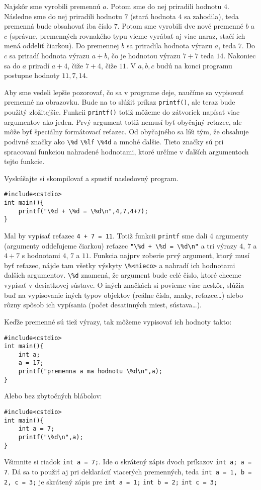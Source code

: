 \riesenie
Najskôr sme vyrobili premennú $a$. Potom sme do nej priradili hodnotu $4$.
Následne sme do nej priradili hodnotu $7$ (stará hodnota $4$ sa zahodila), teda
premenná bude obsahovať iba číslo $7$. Potom sme vyrobili dve nové premenné $b$
a $c$ (správne, premenných rovnakého typu vieme vyrábať aj viac naraz, stačí
ich mená oddeliť čiarkou).  Do premennej $b$ sa priradila hodnota výrazu $a$,
teda $7$. Do $c$ sa priradí hodnota výrazu $a + b$, čo je hodnotou výrazu $7 +
7$ teda $14$. Nakoniec sa do $a$ priradí $a + 4$, čiže $7+4$, čiže $11$. V
$a,b,c$ budú na konci programu postupne hodnoty $11,7,14$.

\medskip

Aby sme vedeli lepšie pozorovať, čo sa v programe deje, naučíme sa vypisovať
premenné na obrazovku. Bude na to slúžiť príkaz \verb!printf()!, ale teraz bude
použitý zložitejšie. Funkcii \verb!printf()! totiž môžeme do zátvoriek napísať
viac argumentov ako jeden. Prvý argument totiž nemusí byť obyčajný reťazec,
ale môže byť špeciálny formátovací reťazec. Od obyčajného sa líši tým, že
obsahuje podivné značky ako \verb!\%d! \verb!\%lf! \verb!\%4d! a mnohé ďalšie.
Tieto značky sú pri spracovaní funkciou nahradené hodnotami, ktoré určíme v
ďalších argumentoch tejto funkcie.

Vyskúšajte si skompilovať a spustiť nasledovný program.
\begin{lstlisting}
#include<cstdio>
int main(){
    printf("\%d + \%d = \%d\n",4,7,4+7);
}
\end{lstlisting}
Mal by vypísať reťazec \verb!4 + 7 = 11!. Totiž funkcii \verb!printf! sme dali
4 argumenty (argumenty oddeľujeme čiarkou) reťazec \verb!"\%d + \%d = \%d\n"! a
tri výrazy $4$, $7$ a $4+7$ s hodnotami $4$, $7$ a $11$.  Funkcia najprv
zoberie prvý argument, ktorý musí byť reťazec, nájde tam všetky výskyty
\verb!\%<nieco>! a nahradí ich hodnotami ďalších argumentov.  \verb!\%d! znamená,
že argument bude celé číslo, ktoré chceme vypísať v desiatkovej sústave. O
iných značkách si povieme viac neskôr, slúžia buď na vypisovanie iných typov
objektov (reálne čísla, znaky, reťazce\dots) alebo rôzny spôsob ich vypísania
(počet desatinných miest, sústava\dots).

Keďže premenné sú tiež výrazy, tak môžeme vypisovať ich hodnoty takto:
\begin{lstlisting}
#include<cstdio>
int main(){
    int a;
    a = 17;
    printf("premenna a ma hodnotu \%d\n",a);
}
\end{lstlisting}
Alebo bez zbytočných blábolov:
\begin{lstlisting}
#include<cstdio>
int main(){
    int a = 7;
    printf("\%d\n",a);
}
\end{lstlisting}
Všimnite si riadok \verb!int a = 7;!. Ide o skrátený zápis dvoch príkazov
\verb!int a; a = 7!. Dá sa to použiť aj pri deklarácií viacerých premenných,
teda \verb!int a = 1, b = 2, c = 3;! je skrátený zápis pre \verb!int a = 1;!
\verb!int b = 2;! \verb!int c = 3;!

